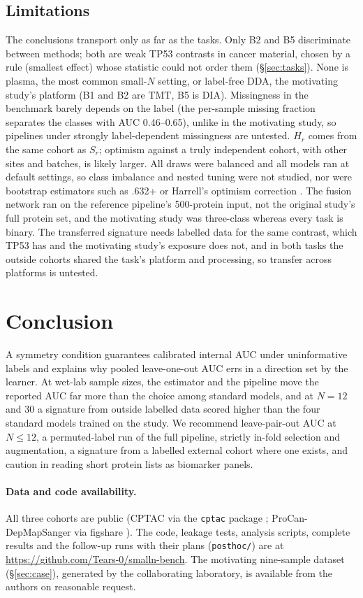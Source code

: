 \documentclass[10pt,letterpaper]{article}
\newcommand{\coderepo}{\url{https://github.com/Tears-0/smalln-bench}}
\begin{document}
\subsection{Limitations}
The conclusions transport only as far as the tasks. Only B2 and B5 discriminate between methods; both are weak
TP53 contrasts in cancer material, chosen by a rule (smallest effect) whose statistic could not order them
(\S\ref{sec:tasks}). None is plasma, the most common small-$N$ setting, or label-free DDA, the motivating study's platform (B1 and B2 are TMT, B5 is DIA). Missingness in the benchmark barely depends on the label (the per-sample
missing fraction separates the classes with AUC 0.46--0.65), unlike in the motivating study, so pipelines under strongly label-dependent missingness are untested. $H_r$ comes from
the same cohort as $S_r$; optimism against a truly independent cohort, with other sites and batches, is likely
larger. All draws were balanced and all models ran at default settings, so class imbalance and nested tuning
were not studied, nor were bootstrap estimators such as .632+ \citep{efron1997improvements} or Harrell's
optimism correction \citep{harrell1996multivariable}. The fusion network ran on the reference pipeline's
500-protein input, not the original study's full protein set, and the motivating study was three-class
whereas every task is binary. The transferred signature needs labelled data for the same contrast, which TP53
has and the motivating study's exposure does not, and in both tasks the outside cohorts shared the task's
platform and processing, so transfer across platforms is untested.

\FloatBarrier
\section{Conclusion}
A symmetry condition guarantees calibrated internal AUC under uninformative labels and explains why pooled
leave-one-out AUC errs in a direction set by the learner. At
wet-lab sample sizes, the estimator and the pipeline move the reported AUC far more than the choice among
standard models, and at $N = 12$ and 30 a signature from outside labelled data scored higher than the four
standard models trained on the study. We recommend leave-pair-out
AUC at $N \le 12$, a permuted-label run of the full pipeline, strictly in-fold selection and augmentation, a
signature from a labelled external cohort where one exists, and caution in reading short protein lists as
biomarker panels.

\paragraph{Data and code availability.} All three cohorts are public (CPTAC via the \texttt{cptac} package
\citep{lindgren2021cptac}; ProCan-DepMapSanger via figshare \citep{goncalves2022procan}). The code,
leakage tests, analysis scripts, complete results and the follow-up runs with their plans (\texttt{posthoc/})
are at \coderepo.
The motivating nine-sample dataset (\S\ref{sec:case}),
generated by the collaborating laboratory, is available from the authors on reasonable request.



\end{document}
